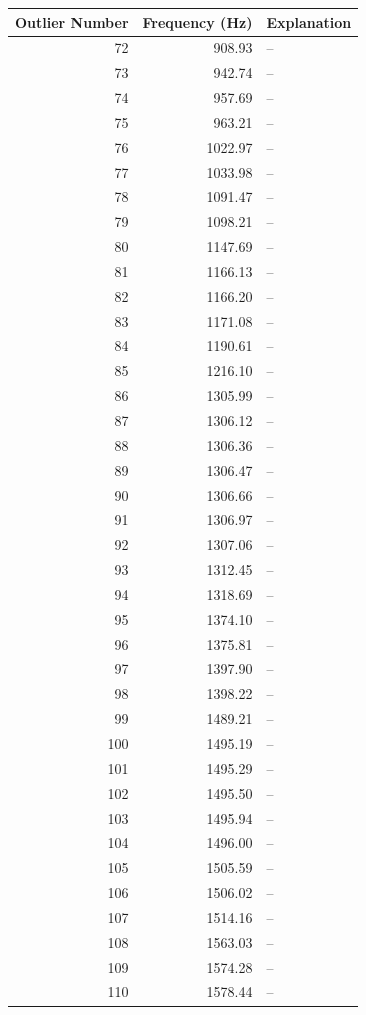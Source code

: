 \begin{table}
\begin{center}
\begin{tabular}{r r l}
Outlier Number & Frequency (Hz) & Explanation \\
\hline
72 & 908.93 & -- \\
73 & 942.74 & -- \\
74 & 957.69 & -- \\
75 & 963.21 & -- \\
76 & 1022.97 & -- \\
77 & 1033.98 & -- \\
78 & 1091.47 & -- \\
79 & 1098.21 & -- \\
80 & 1147.69 & -- \\
81 & 1166.13 & -- \\
82 & 1166.20 & -- \\
83 & 1171.08 & -- \\
84 & 1190.61 & -- \\
85 & 1216.10 & -- \\
86 & 1305.99 & -- \\
87 & 1306.12 & -- \\
88 & 1306.36 & -- \\
89 & 1306.47 & -- \\
90 & 1306.66 & -- \\
91 & 1306.97 & -- \\
92 & 1307.06 & -- \\
93 & 1312.45 & -- \\
94 & 1318.69 & -- \\
95 & 1374.10 & -- \\
96 & 1375.81 & -- \\
97 & 1397.90 & -- \\
98 & 1398.22 & -- \\
99 & 1489.21 & -- \\
100 & 1495.19 & -- \\
101 & 1495.29 & -- \\
102 & 1495.50 & -- \\
103 & 1495.94 & -- \\
104 & 1496.00 & -- \\
105 & 1505.59 & -- \\
106 & 1506.02 & -- \\
107 & 1514.16 & -- \\
108 & 1563.03 & -- \\
109 & 1574.28 & -- \\
110 & 1578.44 & -- \\

\end{tabular}
\end{center}
\end{table}
